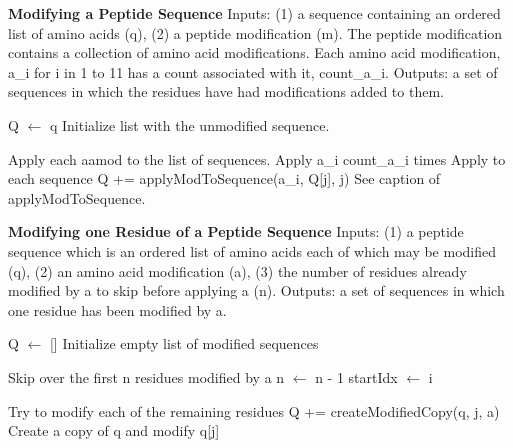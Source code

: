 \documentclass[12pt]{article}
\begin{document}
\begin{algorithm}
\caption{{\bf Modifying a Peptide Sequence} Inputs: (1) a sequence
  containing an ordered list of amino acids (q), (2) a peptide
  modification (m).  The peptide modification contains a collection of 
  amino acid modifications.  Each amino acid modification, a\_i for i
  in 1 to 11 has a count associated with it, count\_a\_i.  Outputs: a
  set of sequences in which the residues have had modifications added
  to them.}

\begin{algorithmic}[1]

  \State Q $\gets$ q
  \Comment Initialize list with the unmodified sequence.

  \Comment Apply each aamod to the list of sequences.
    \Comment Apply a\_i count\_a\_i times 
      \Comment Apply to each sequence
        \State Q += applyModToSequence(a\_i, Q[j], j)
        \Comment See caption of applyModToSequence.
      \EndFor
    \EndFor
  \EndFor

  \State {}

\EndProcedure
\end{algorithmic}
\end{algorithm}

\begin{algorithm}
\caption{{\bf Modifying one Residue of a Peptide Sequence} Inputs: (1)
  a peptide sequence which is an ordered list of amino acids each of which
  may be modified (q), (2) an amino acid modification (a), (3) the number
  of residues already modified by a to skip before applying a
  (n). Outputs: a set of sequences in which one residue has been
  modified by a.} 
\begin{algorithmic}[1]

  \State Q $\gets$ []
  \Comment Initialize empty list of modified sequences

  \Comment Skip over the first n residues modified by a
      \State n $\gets$ n - 1
    \EndIf
      \State startIdx $\gets$ i
    \EndIf
  \EndFor

  \Comment Try to modify each of the remaining residues
      \State Q += createModifiedCopy(q, j, a)
      \Comment Create a copy of q and modify q[j]
    \EndIf
  \EndFor

  \State {}

\EndProcedure
\end{algorithmic}
\end{algorithm}
\end{document}
